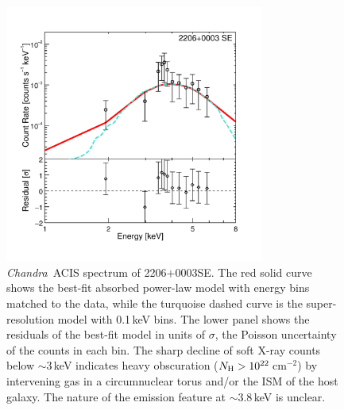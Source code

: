 \documentclass[iop,revtex4,twocolumn,apj,numberedappendix,appendixfloats]{emulateapj}
\newcommand{\chandra}{{\it Chandra}}
\begin{document}
\begin{figure}
\includegraphics[width=8.5cm]{figs/spectral_fit_PLf.pdf}
\caption{\chandra\ ACIS spectrum of 2206$+$0003SE. The red solid curve shows the best-fit absorbed power-law model with energy bins matched to the data, while the turquoise dashed curve is the super-resolution model with 0.1\,keV bins. The lower panel shows the residuals of the best-fit model in units of $\sigma$, the Poisson uncertainty of the counts in each bin. The sharp decline of soft X-ray counts below $\sim$3\,keV indicates heavy obscuration ($N_{\rm H} > 10^{22}$\,cm$^{-2}$) by intervening gas in a circumnuclear torus and/or the ISM of the host galaxy. The nature of the emission feature at $\sim$3.8\,keV is unclear.}
\label{fig:sherpa}
\end{figure}
\end{document}
